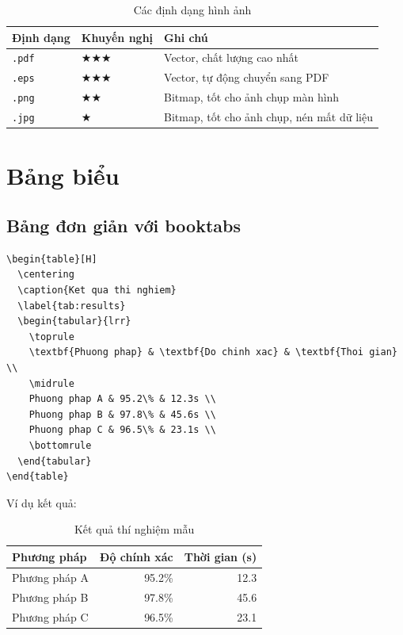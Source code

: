 \begin{table}[H]
\centering
\caption{Các định dạng hình ảnh}
\label{tab:image-formats}
\begin{tabular}{llp{7cm}}
\toprule
\textbf{Định dạng} & \textbf{Khuyến nghị} & \textbf{Ghi chú} \\
\midrule
\texttt{.pdf} & $\bigstar\bigstar\bigstar$ & Vector, chất lượng cao nhất \\
\texttt{.eps} & $\bigstar\bigstar\bigstar$ & Vector, tự động chuyển sang PDF \\
\texttt{.png} & $\bigstar\bigstar$ & Bitmap, tốt cho ảnh chụp màn hình \\
\texttt{.jpg} & $\bigstar$ & Bitmap, tốt cho ảnh chụp, nén mất dữ liệu \\
\bottomrule
\end{tabular}
\end{table}

\section{Bảng biểu}
\label{sec:tables}

\subsection{Bảng đơn giản với booktabs}

\begin{lstlisting}[style=latexstyle, caption={Bảng với booktabs (khuyến nghị)}]
\begin{table}[H]
  \centering
  \caption{Ket qua thi nghiem}
  \label{tab:results}
  \begin{tabular}{lrr}
    \toprule
    \textbf{Phuong phap} & \textbf{Do chinh xac} & \textbf{Thoi gian} \\
    \midrule
    Phuong phap A & 95.2\% & 12.3s \\
    Phuong phap B & 97.8\% & 45.6s \\
    Phuong phap C & 96.5\% & 23.1s \\
    \bottomrule
  \end{tabular}
\end{table}
\end{lstlisting}

Ví dụ kết quả:

\begin{table}[H]
  \centering
  \caption{Kết quả thí nghiệm mẫu}
  \label{tab:sample-results}
  \begin{tabular}{lrr}
    \toprule
    \textbf{Phương pháp} & \textbf{Độ chính xác} & \textbf{Thời gian (s)} \\
    \midrule
    Phương pháp A & 95.2\% & 12.3 \\
    Phương pháp B & 97.8\% & 45.6 \\
    Phương pháp C & 96.5\% & 23.1 \\
    \bottomrule
  \end{tabular}
\end{table}

